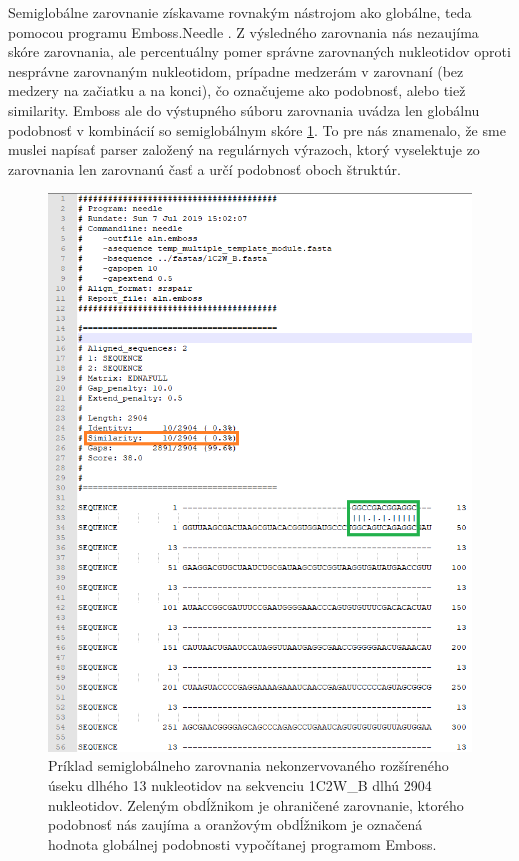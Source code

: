 \indent Semiglobálne zarovnanie získavame rovnakým nástrojom ako globálne, teda pomocou programu Emboss.Needle \cite{Emboss}. Z výsledného zarovnania nás nezaujíma skóre zarovnania, ale percentuálny pomer správne zarovnaných nukleotidov oproti nesprávne zarovnaným nukleotidom, prípadne medzerám v  zarovnaní (bez medzery na začiatku a na konci), čo označujeme ako podobnosť, alebo tiež similarity. Emboss ale do výstupného súboru zarovnania uvádza len globálnu podobnosť v kombinácií so semiglobálnym skóre \ref{obr06:emboss}. To pre nás znamenalo, že sme muslei napísať parser založený na regulárnych výrazoch, ktorý vyselektuje zo zarovnania len zarovnanú časť a určí podobnosť oboch štruktúr.
\begin{figure}%
\includegraphics[width=\textwidth]{../img/emboss}
\caption{Príklad semiglobálneho zarovnania nekonzervovaného rozšíreného úseku dlhého 13 nukleotidov na sekvenciu 1C2W\_B dlhú 2904 nukleotidov. Zeleným obdĺžnikom je ohraničené zarovnanie, ktorého podobnosť nás zaujíma a oranžovým obdĺžnikom je označená hodnota globálnej podobnosti vypočítanej programom Emboss.}
\label{obr06:emboss}
\end{figure}


